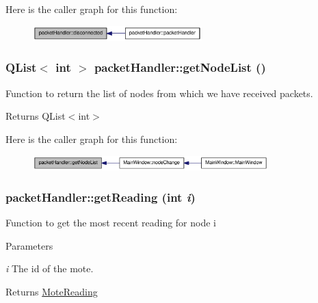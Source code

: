 Here is the caller graph for this function:\nopagebreak
\begin{figure}[H]
\begin{center}
\leavevmode
\includegraphics[width=185pt]{classpacketHandler_a43223a8930a6af8c40c5889d8e4b9d4b_icgraph}
\end{center}
\end{figure}


\hypertarget{classpacketHandler_a7d07166d577b014234ad311599ac3291}{
\subsubsection[{getNodeList}]{\setlength{\rightskip}{0pt plus 5cm}QList$<$ int $>$ packetHandler::getNodeList ()}}
\label{classpacketHandler_a7d07166d577b014234ad311599ac3291}
Function to return the list of nodes from which we have received packets. \begin{DoxyReturn}{Returns}
QList$<$int$>$ 
\end{DoxyReturn}


Here is the caller graph for this function:\nopagebreak
\begin{figure}[H]
\begin{center}
\leavevmode
\includegraphics[width=258pt]{classpacketHandler_a7d07166d577b014234ad311599ac3291_icgraph}
\end{center}
\end{figure}


\hypertarget{classpacketHandler_aec6fa94602daa18227491b76001152cb}{
\subsubsection[{getReading}]{ packetHandler::getReading (int {\em i})}}
\label{classpacketHandler_aec6fa94602daa18227491b76001152cb}
Function to get the most recent reading for node i 
\begin{DoxyParams}{Parameters}
\item[{\em i}]The id of the mote. \end{DoxyParams}
\begin{DoxyReturn}{Returns}
\hyperlink{classMoteReading}{MoteReading} 
\end{DoxyReturn}


